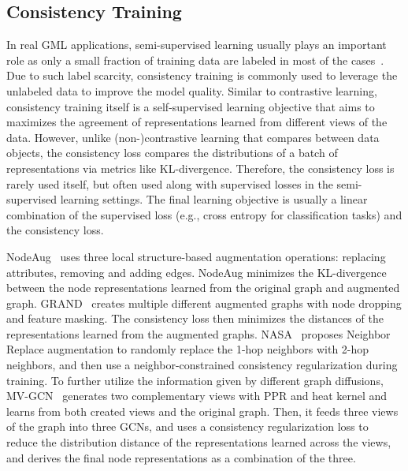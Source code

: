 \documentclass[11pt]{article}
\begin{document}
\subsection{Consistency Training}
\label{sec:tong_consistent}

In real GML applications, semi-supervised learning usually plays an important role as only a small fraction of training data are labeled in most of the cases~\cite{wu2020comprehensive}. Due to such label scarcity, consistency training is commonly used to leverage the unlabeled data to improve the model quality. Similar to contrastive learning, consistency training itself is a self-supervised learning objective that aims to maximizes the agreement of representations learned from different views of the data. However, unlike (non-)contrastive learning that compares between data objects, the consistency loss compares the distributions of a batch of representations via metrics like KL-divergence. Therefore, the consistency loss is rarely used itself, but often used along with supervised losses in the semi-supervised learning settings. The final learning objective is usually a linear combination of the supervised loss (e.g., cross entropy for classification tasks) and the consistency loss.

NodeAug~\cite{wang2020nodeaug} uses three local structure-based augmentation operations: replacing attributes, removing and adding edges. NodeAug minimizes the KL-divergence between the node representations learned from the original graph and augmented graph. GRAND~\cite{feng2020graph} creates multiple different augmented graphs with node dropping and feature masking. The consistency loss then minimizes the distances of the representations learned from the augmented graphs. 
NASA~\cite{bo2022regularizing} proposes Neighbor Replace augmentation to randomly replace the 1-hop neighbors with 2-hop neighbors, and then use a neighbor-constrained consistency regularization during training.
To further utilize the information given by different graph diffusions, MV-GCN~\cite{yuan2021semi} generates two complementary views with PPR and heat kernel and learns from both created views and the original graph. Then, it feeds three views of the graph into three GCNs, and uses a consistency regularization loss to reduce the distribution distance of the representations learned across the views, and derives the final node representations as a  combination of the three.
\end{document}
